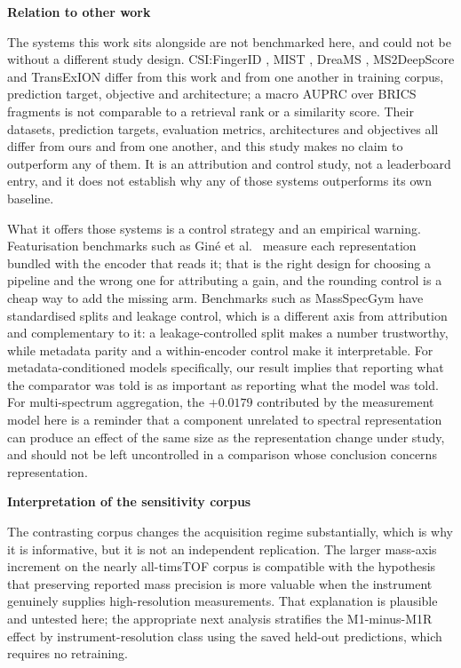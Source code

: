 \documentclass[11pt]{article}
\newcommand{\hd}[1]{\medskip\par\noindent\textbf{#1}\par\nobreak\vspace{2pt}\noindent\ignorespaces}
\begin{document}
\hd{Relation to other work}
The systems this work sits alongside are not benchmarked here, and could not be without a different study design. CSI:FingerID \cite{duhrkop2015csifingerid}, MIST \cite{goldman2023mist}, DreaMS \cite{bushuiev2025dreams}, MS2DeepScore \cite{huber2021ms2deepscore} and TransExION \cite{buithi2024transexion} differ from this work and from one another in training corpus, prediction target, objective and architecture; a macro AUPRC over BRICS fragments is not comparable to a retrieval rank or a similarity score. Their datasets, prediction targets, evaluation metrics, architectures and objectives all differ from ours and from one another, and this study makes no claim to outperform any of them. It is an attribution and control study, not a leaderboard entry, and it does not establish why any of those systems outperforms its own baseline.

What it offers those systems is a control strategy and an empirical warning. Featurisation benchmarks such as Gin\'e et al.\ \cite{gine2026benchmarking} measure each representation bundled with the encoder that reads it; that is the right design for choosing a pipeline and the wrong one for attributing a gain, and the rounding control is a cheap way to add the missing arm. Benchmarks such as MassSpecGym \cite{bushuiev2024massspecgym} have standardised splits and leakage control, which is a different axis from attribution and complementary to it: a leakage-controlled split makes a number trustworthy, while metadata parity and a within-encoder control make it interpretable. For metadata-conditioned models specifically, our result implies that reporting what the comparator was told is as important as reporting what the model was told. For multi-spectrum aggregation, the $+0.0179$ contributed by the measurement model here is a reminder that a component unrelated to spectral representation can produce an effect of the same size as the representation change under study, and should not be left uncontrolled in a comparison whose conclusion concerns representation.

\hd{Interpretation of the sensitivity corpus}
The contrasting corpus changes the acquisition regime substantially, which is why it is informative, but it is not an independent replication. The larger mass-axis increment on the nearly all-timsTOF corpus is compatible with the hypothesis that preserving reported mass precision is more valuable when the instrument genuinely supplies high-resolution measurements. That explanation is plausible and untested here; the appropriate next analysis stratifies the M1-minus-M1R effect by instrument-resolution class using the saved held-out predictions, which requires no retraining.
\end{document}
